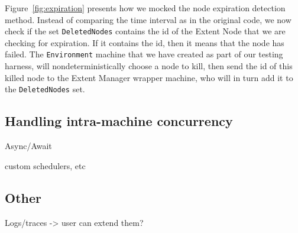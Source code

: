 Figure~\ref{fig:expiration} presents how we mocked the node expiration detection method. Instead of comparing the time interval as in the original code, we now check if the set \texttt{DeletedNodes} contains the id of the Extent Node that we are checking for expiration. If it contains the id, then it means that the node has failed. The \texttt{Environment} machine that we have created as part of our testing \psharp harness, will nondeterministically choose a node to kill, then send the id of this killed node to the Extent Manager wrapper machine, who will in turn add it to the \texttt{DeletedNodes} set.

\subsection{Handling intra-machine concurrency}
\label{sec:method:async}

Async/Await

custom schedulers, etc

\subsection{Other}
\label{sec:method:other}

Logs/traces -> user can extend them?

